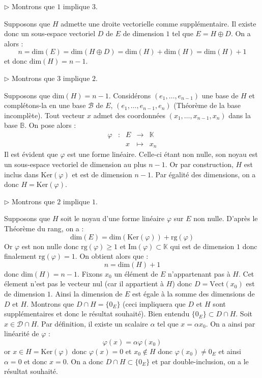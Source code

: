 \documentclass[french,11pt,twoside]{VcCours}
\renewcommand{\trou}[1]{{\color{blue}#1}}
\begin{document}
\begin{Demonstration}{}

\trou{
$\rhd$ Montrons que $1$ implique $3$. 

Supposons que $H$ admette une droite vectorielle comme supplémentaire. Il existe donc un sous-espace vectoriel $D$ de $E$ de dimension $1$ tel que $E= H \oplus D$. On a alors :
$$ n=\textrm{dim}(E) =  \textrm{dim}(H \oplus D) = \textrm{dim}(H) + \textrm{dim}(H) = \textrm{dim}(H)+1$$
et donc $\textrm{dim}(H)=n-1$.

$\rhd$ Montrons que $3$ implique $2$.

Supposons que $\textrm{dim}(H)=n-1$. Considérons $(e_1, \ldots, e_{n-1})$ une base de $H$ et complétons-la en une base $\mathcal{B}$ de $E$, $(e_1, \ldots, e_{n-1},e_n)$ (Théorème de la base incomplète). Tout vecteur $x$ admet des coordonnées $(x_1, \ldots, x_{n-1},x_n)$ dans la base $\mathbb{B}$. On pose alors :
$$ \begin{array}{ccccl}
\varphi & : & E & \rightarrow & \mathbb{K} \\
& & x & \mapsto & x_n
\end{array}$$
Il est évident que $\varphi$ est une forme linéaire. Celle-ci étant non nulle, son noyau est un sous-espace vectoriel de dimension au plus $n-1$. Or par construction, $H$ est inclus dans $\textrm{Ker}(\varphi)$ et est de dimension $n-1$. Par égalité des dimensions, on a donc $H = \textrm{Ker}(\varphi)$.

$\rhd$ Montrons que $2$ implique $1$.

Supposons que $H$ soit le noyau d'une forme linéaire $\varphi$ sur $E$ non nulle. D'après le Théorème du rang, on a :
$$ \textrm{dim}(E) = \textrm{dim}(\textrm{Ker}(\varphi)) +  \textrm{rg}(\varphi)$$
Or $\varphi$ est non nulle donc $\textrm{rg}(\varphi) \geq 1$ et $\textrm{Im}(\varphi) \subset \mathbb{K}$ qui est de dimension $1$ donc finalement $\textrm{rg}(\varphi) =1$. On obtient alors que :
$$ n = \textrm{dim}(H) + 1 $$
donc $\textrm{dim}(H) = n-1$. Fixons $x_0$ un élément de $E$ n'appartenant pas à $H$. Cet élement n'est pas le vecteur nul (car il appartient à $H$) donc $D = \textrm{Vect}(x_0)$ est de dimension $1$. Ainsi la dimension de $E$ est égale à la somme des dimensions de $D$ et $H$. Montrons que $D \cap H = \lbrace 0_E \rbrace$ (ceci impliquera que $D$ et $H$ sont supplémentaires et donc le résultat souhaité). Bien entendu $\lbrace 0_E \rbrace \subset D \cap H$. Soit $x \in \mathcal{D} \cap H$. Par définition, il existe un scalaire $\alpha$ tel que $x = \alpha x_0$. On a ainsi par linéarité de $\varphi$ :
$$ \varphi(x) = \alpha \varphi(x_0)$$
or $x \in H = \textrm{Ker}(\varphi)$ donc $\varphi(x)=0$ et $x_0 \notin H$ donc $\varphi(x_0) \neq 0_E$ et ainsi $\alpha = 0$ et donc $x=0$. On a donc $D \cap H \subset \lbrace 0_E \rbrace$ et par double-inclusion, on a le résultat souhaité.
}

\end{Demonstration}
\end{document}

